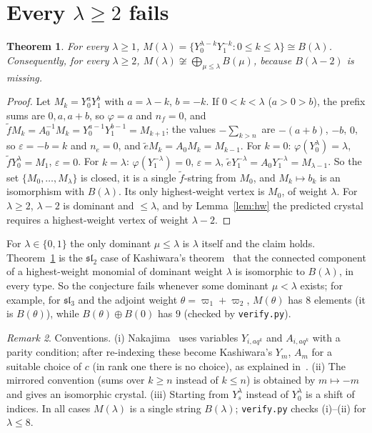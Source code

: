 \documentclass[11pt]{article}
\newtheorem{theorem}{Theorem}
\theoremstyle{definition}
\theoremstyle{remark}
\newtheorem{remark}[theorem]{Remark}
\newcommand{\et}{\tilde e}
\newcommand{\ft}{\tilde f}
\begin{document}
\section{Every \texorpdfstring{$\lambda\ge2$}{lambda >= 2} fails}
\begin{theorem}\label{thm:all}
For every $\lambda\ge1$,
$M(\lambda)=\{Y_0^{\lambda-k}Y_1^{-k}:0\le k\le\lambda\}\cong B(\lambda)$.
Consequently, for every $\lambda\ge2$,
$M(\lambda)\not\cong\bigoplus_{\mu\le\lambda}B(\mu)$, because $B(\lambda-2)$ is
missing.
\end{theorem}
\begin{proof}
Let $M_k=Y_0^{a}Y_1^{b}$ with $a=\lambda-k$, $b=-k$. If $0<k<\lambda$
($a>0>b$), the prefix sums are $0,a,a+b$, so $\varphi=a$ and $n_f=0$, and
$\ft M_k=A_0^{-1}M_k=Y_0^{a-1}Y_1^{b-1}=M_{k+1}$; the values $-\sum_{k>n}$ are
$-(a+b)$, $-b$, $0$, so $\varepsilon=-b=k$ and $n_e=0$, and
$\et M_k=A_0M_k=M_{k-1}$. For $k=0$: $\varphi(Y_0^\lambda)=\lambda$,
$\ft Y_0^\lambda=M_1$, $\varepsilon=0$. For $k=\lambda$: $\varphi(Y_1^{-\lambda})=0$,
$\varepsilon=\lambda$, $\et Y_1^{-\lambda}=A_0Y_1^{-\lambda}=M_{\lambda-1}$. So the set
$\{M_0,\dots,M_\lambda\}$ is closed, it is a single $\ft$-string from $M_0$, and
$M_k\mapsto b_k$ is an isomorphism with $B(\lambda)$. Its only highest-weight
vertex is $M_0$, of weight $\lambda$. For $\lambda\ge2$, $\lambda-2$ is dominant and
$\le\lambda$, and by Lemma~\ref{lem:hw} the predicted crystal requires a
highest-weight vertex of weight $\lambda-2$.
\end{proof}
For $\lambda\in\{0,1\}$ the only dominant $\mu\le\lambda$ is $\lambda$ itself and the
claim holds. Theorem~\ref{thm:all} is the $\mathfrak{sl}_2$ case of Kashiwara's
theorem~\cite{kas} that the connected component of a highest-weight monomial of
dominant weight $\lambda$ is isomorphic to $B(\lambda)$, in every type.
So the conjecture fails whenever some dominant $\mu<\lambda$ exists; for
example, for $\mathfrak{sl}_3$ and the adjoint weight $\theta=\varpi_1+\varpi_2$,
$M(\theta)$ has $8$ elements (it is $B(\theta)$), while $B(\theta)\oplus B(0)$
has $9$ (checked by \texttt{verify.py}).

\begin{remark}\label{rem:conv}
Conventions. (i) Nakajima~\cite{nak} uses variables $Y_{i,aq^k}$ and
$A_{i,aq^k}$ with a parity condition; after re-indexing these become
Kashiwara's $Y_m$, $A_m$ for a suitable choice of $c$ (in rank one there is
no choice), as explained in~\cite{kas}. (ii) The mirrored convention
(sums over $k\ge n$ instead of $k\le n$) is obtained by $m\mapsto-m$ and gives an
isomorphic crystal. (iii) Starting from $Y_s^\lambda$ instead of $Y_0^\lambda$ is a
shift of indices. In all cases $M(\lambda)$ is a single string $B(\lambda)$;
\texttt{verify.py} checks (i)--(ii) for $\lambda\le8$.
\end{remark}
\end{document}

